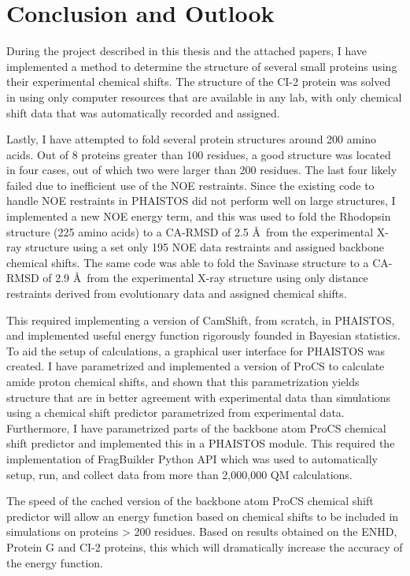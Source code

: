 \chapter{Conclusion and Outlook}

During the project described in this thesis and the attached papers, I have implemented a method to determine the structure of several small proteins using their experimental chemical shifts.
The structure of the CI-2 protein was solved in using only computer resources that are available in any lab, with only chemical shift data that was automatically recorded and assigned.

Lastly, I have attempted to fold several protein structures around 200 amino acids.
Out of 8 proteins greater than 100 residues, a good structure was located in four cases, out of which two were larger than 200 residues.
The last four likely failed due to inefficient use of the NOE restraints.
Since the existing code to handle NOE restraints in PHAISTOS did not perform well on large structures, I implemented a new NOE energy term, and this was used to fold the Rhodopsin structure (225 amino acids) to a CA-RMSD of 2.5 \AA~from the experimental X-ray structure using a set only 195 NOE data restraints and assigned backbone chemical shifts.
The same code was able to fold the Savinase structure to a CA-RMSD of 2.9 \AA~from the experimental X-ray structure using only distance restraints derived from evolutionary data and assigned chemical shifts.

This required implementing a version of CamShift, from scratch, in PHAISTOS, and implemented useful energy function rigorously founded in Bayesian statistics.
To aid the setup of calculations, a graphical user interface for PHAISTOS was created.
I have parametrized and implemented a version of ProCS to calculate amide proton chemical shifts, and shown that this parametrization yields structure that are in better agreement with experimental data than simulations using a chemical shift predictor parametrized from experimental data.
Furthermore, I have parametrized parts of the backbone atom ProCS chemical shift predictor and implemented this in a PHAISTOS module.
This required the implementation of FragBuilder Python API which was used to automatically setup, run, and collect data from more than 2,000,000 QM calculations.

The speed of the cached version of the backbone atom ProCS chemical shift predictor will allow an energy function based on chemical shifts to be included in simulations on proteins > 200 residues. Based on results obtained on the ENHD, Protein G and CI-2 proteins, this which will dramatically increase the accuracy of the energy function.

